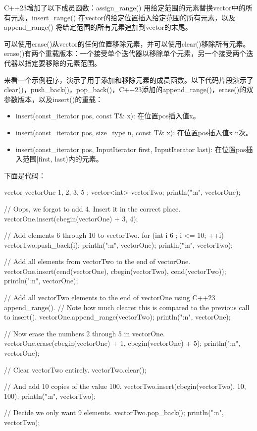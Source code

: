 
C++23增加了以下成员函数：assign\_range() 用给定范围的元素替换vector中的所有元素，insert\_range() 在vector的给定位置插入给定范围的所有元素，以及append\_range() 将给定范围的所有元素追加到vector的末尾。

可以使用erase()从vector的任何位置移除元素，并可以使用clear()移除所有元素。erase()有两个重载版本：一个接受单个迭代器以移除单个元素，另一个接受两个迭代器以指定要移除的元素范围。

来看一个示例程序，演示了用于添加和移除元素的成员函数。以下代码片段演示了clear()，push\_back()，pop\_back()，C++23添加的append\_range()，erase()的双参数版本，以及insert()的重载：

\begin{itemize}
\item
insert(const\_iterator pos, const T\& x): 在位置pos插入值x。

\item
insert(const\_iterator pos, size\_type n, const T\& x): 在位置pos插入值x n次。

\item
insert(const\_iterator pos, InputIterator first, InputIterator last): 在位置pos插入范围[first, last)内的元素。
\end{itemize}

下面是代码：

\begin{cpp}
vector vectorOne { 1, 2, 3, 5 };
vector<int> vectorTwo;
println("{:n}", vectorOne);

// Oops, we forgot to add 4. Insert it in the correct place.
vectorOne.insert(cbegin(vectorOne) + 3, 4);

// Add elements 6 through 10 to vectorTwo.
for (int i { 6 }; i <= 10; ++i) {
    vectorTwo.push_back(i);
}
println("{:n}", vectorOne);
println("{:n}", vectorTwo);

// Add all elements from vectorTwo to the end of vectorOne.
vectorOne.insert(cend(vectorOne), cbegin(vectorTwo), cend(vectorTwo));
println("{:n}", vectorOne);

// Add all vectorTwo elements to the end of vectorOne using C++23 append_range().
// Note how much clearer this is compared to the previous call to insert().
vectorOne.append_range(vectorTwo);
println("{:n}", vectorOne);

// Now erase the numbers 2 through 5 in vectorOne.
vectorOne.erase(cbegin(vectorOne) + 1, cbegin(vectorOne) + 5);
println("{:n}", vectorOne);

// Clear vectorTwo entirely.
vectorTwo.clear();

// And add 10 copies of the value 100.
vectorTwo.insert(cbegin(vectorTwo), 10, 100);
println("{:n}", vectorTwo);

// Decide we only want 9 elements.
vectorTwo.pop_back();
println("{:n}", vectorTwo);
\end{cpp}


